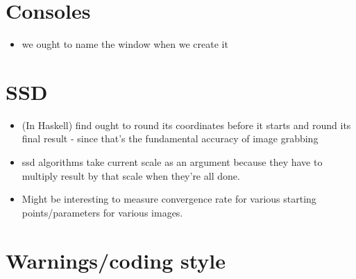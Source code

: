 \section{Consoles}

\begin{itemize}
\item
  we ought to name the window when we create it
\end{itemize}


\section{SSD}

\begin{itemize}
\item
(In Haskell) find ought to round its coordinates before it starts 
and round its final result - since that's the fundamental
accuracy of image grabbing

\item
ssd algorithms take current scale as an argument because they
have to multiply result by that scale when they're all done.

\item
Might be interesting to measure convergence rate for various starting
points/parameters for various images.

\end{itemize}


\section{Warnings/coding style}

